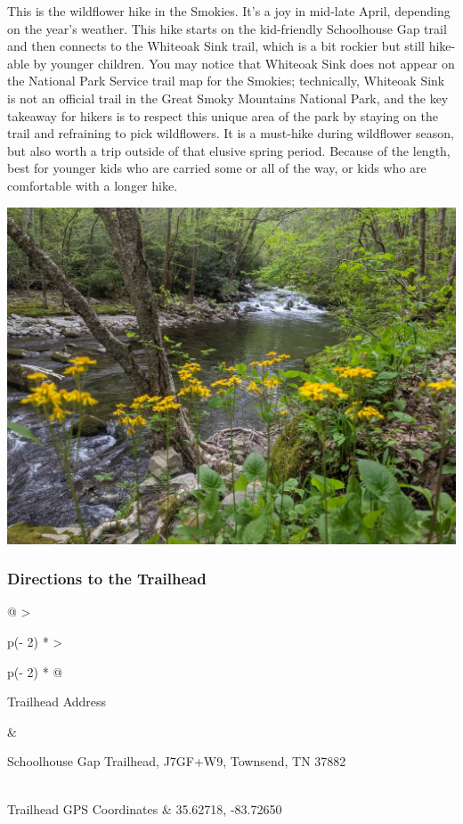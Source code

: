 \documentclass[
  letterpaper,
  DIV=11,
  numbers=noendperiod]{scrartcl}
\begin{document}
This is the wildflower hike in the Smokies. It's a joy in mid-late
April, depending on the year's weather. This hike starts on the
kid-friendly Schoolhouse Gap trail and then connects to the Whiteoak
Sink trail, which is a bit rockier but still hike-able by younger
children. You may notice that Whiteoak Sink does not appear on the
National Park Service trail map for the Smokies; technically, Whiteoak
Sink is not an official trail in the Great Smoky Mountains National
Park, and the key takeaway for hikers is to respect this unique area of
the park by staying on the trail and refraining to pick wildflowers. It
is a must-hike during wildflower season, but also worth a trip outside
of that elusive spring period. Because of the length, best for younger
kids who are carried some or all of the way, or kids who are comfortable
with a longer hike.

\includegraphics{img/trail-21-figure-01.jpg}

\hypertarget{directions-to-the-trailhead-22}{%
\subsubsection{Directions to the
Trailhead}\label{directions-to-the-trailhead-22}}

\begin{longtable}[]{@{}
  >{\raggedright\arraybackslash}p{(\columnwidth - 2\tabcolsep) * }
  >{\raggedright\arraybackslash}p{(\columnwidth - 2\tabcolsep) * }@{}}
\toprule\noalign{}
\begin{minipage}[b]{\linewidth}\raggedright
Trailhead Address
\end{minipage} & \begin{minipage}[b]{\linewidth}\raggedright
Schoolhouse Gap Trailhead, J7GF+W9, Townsend, TN 37882
\end{minipage} \\
\midrule\noalign{}
\endhead
\bottomrule\noalign{}
\endlastfoot
Trailhead GPS Coordinates & 35.62718, -83.72650 \\
\end{longtable}
\end{document}
